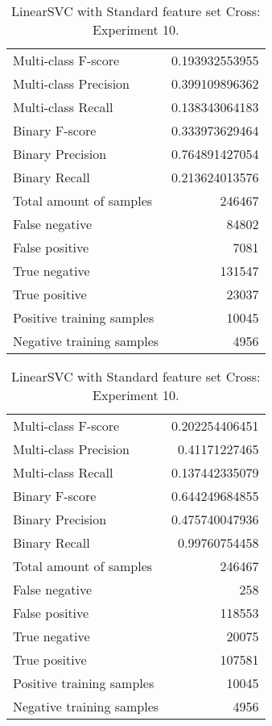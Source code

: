 \begin{table}[H]
\begin{minipage}{0.5\textwidth}
\caption{LinearSVC with Standard feature set Cross: Experiment 9.}
\centering
\begin{tabular}{l r}
\toprule
Multi-class F-score & 0.193932553955 \\
Multi-class Precision & 0.399109896362 \\
Multi-class Recall & 0.138343064183 \\
\midrule
Binary F-score & 0.333973629464 \\
Binary Precision & 0.764891427054 \\
Binary Recall & 0.213624013576 \\
\midrule
Total amount of samples & 246467 \\
False negative & 84802 \\
False positive & 7081 \\
True negative & 131547 \\
True positive & 23037 \\
\midrule
Positive training samples & 10045 \\
Negative training samples & 4956 \\
\bottomrule
\end{tabular}
\end{minipage}
\hfillx
\begin{minipage}{0.5\textwidth}
\caption{LinearSVC with Standard feature set Cross: Experiment 10.}
\centering
\begin{tabular}{l r}
\toprule
Multi-class F-score & 0.202254406451 \\
Multi-class Precision & 0.41171227465 \\
Multi-class Recall & 0.137442335079 \\
\midrule
Binary F-score & 0.644249684855 \\
Binary Precision & 0.475740047936 \\
Binary Recall & 0.99760754458 \\
\midrule
Total amount of samples & 246467 \\
False negative & 258 \\
False positive & 118553 \\
True negative & 20075 \\
True positive & 107581 \\
\midrule
Positive training samples & 10045 \\
Negative training samples & 4956 \\
\bottomrule
\end{tabular}
\end{minipage}
\end{table}
